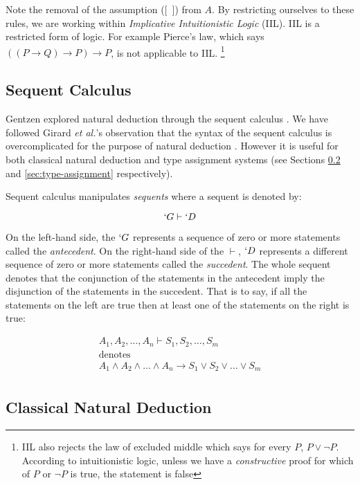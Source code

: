   Note the removal of the assumption ([\ ]) from $A$.
  By restricting ourselves to these rules, we are working within \emph{Implicative Intuitionistic Logic} (IIL).
  IIL is a restricted form of logic.
  For example Pierce's law, which says $((P \to Q) \to P) \to P$, is not applicable to IIL.
  \footnote{IIL also rejects the law of excluded middle which says for every $P$, $P \lor \neg P$.
  According to intuitionistic logic, unless we have a \emph{constructive} proof for which of $P$ or $\neg P$ is true, the statement is false}
  
  
  
  \subsection{Sequent Calculus}
  
  Gentzen explored natural deduction through the sequent calculus \cite{Wadler15}.
  We have followed Girard \emph{et al.}'s observation that the syntax of the sequent calculus is overcomplicated for the purpose of natural deduction \cite{Girard89}.
  However it is useful for both classical natural deduction and type assignment systems (see Sections \ref{sec:classical-logic} and \ref{sec:type-assignment} respectively).
  
  Sequent calculus manipulates \emph{sequents} where a sequent is denoted by:
  
    \[
      `G \vdash `D
    \]
    
  On the left-hand side, the $`G$ represents a sequence of zero or more statements called the \emph{antecedent}.
  On the right-hand side of the $\vdash$, $`D$ represents a different sequence of zero or more statements called the \emph{succedent}.
  The whole sequent denotes that the conjunction of the statements in the antecedent imply the disjunction of the statements in the succedent.
  That is to say, if all the statements on the left are true then at least one of the statements on the right is true:
  
  \[
    \begin{array}{c}
    A_1,A_2,\dots,A_n \vdash S_1,S_2,\dots,S_m \\
      \text{denotes} \\
    A_1 \wedge A_2 \wedge \dots \wedge A_n \to S_1 \lor S_2 \lor \dots \lor S_m \\
    \end{array}
  \]

  \subsection{Classical Natural Deduction}\label{sec:classical-logic}
  
